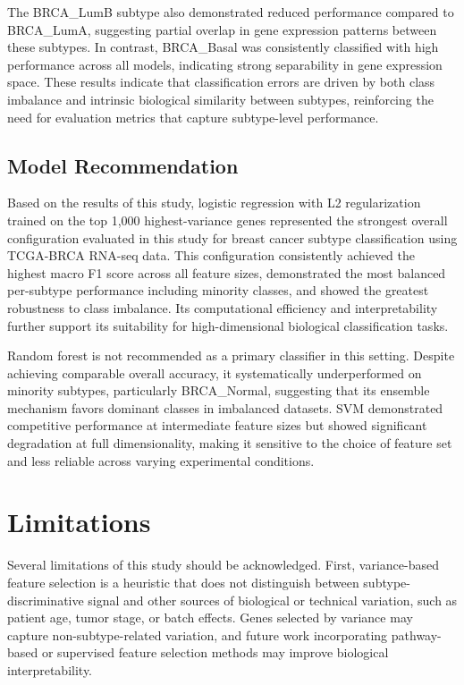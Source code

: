 \documentclass[10pt,twocolumn,letterpaper]{article}
\begin{document}
The BRCA\_LumB subtype also demonstrated reduced performance compared to BRCA\_LumA, suggesting partial overlap in gene expression patterns between these subtypes. In contrast, BRCA\_Basal was consistently classified with high performance across all models, indicating strong separability in gene expression space. These results indicate that classification errors are driven by both class imbalance and intrinsic biological similarity between subtypes, reinforcing the need for evaluation metrics that capture subtype-level performance.

\subsection{Model Recommendation}

Based on the results of this study, logistic regression with L2 regularization trained on the top 1,000 highest-variance genes represented the strongest overall configuration evaluated in this study for breast cancer subtype classification using TCGA-BRCA RNA-seq data. This configuration consistently achieved the highest macro F1 score across all feature sizes, demonstrated the most balanced per-subtype performance including minority classes, and showed the greatest robustness to class imbalance. Its computational efficiency and interpretability further support its suitability for high-dimensional biological classification tasks.

Random forest is not recommended as a primary classifier in this setting. Despite achieving comparable overall accuracy, it systematically underperformed on minority subtypes, particularly BRCA\_Normal, suggesting that its ensemble mechanism favors dominant classes in imbalanced datasets. SVM demonstrated competitive performance at intermediate feature sizes but showed significant degradation at full dimensionality, making it sensitive to the choice of feature set and less reliable across varying experimental conditions.

\FloatBarrier
\section{Limitations}

Several limitations of this study should be acknowledged. First, variance-based feature selection is a heuristic that does not distinguish between subtype-discriminative signal and other sources of biological or technical variation, such as patient age, tumor stage, or batch effects. Genes selected by variance may capture non-subtype-related variation, and future work incorporating pathway-based or supervised feature selection methods may improve biological interpretability.
\end{document}
